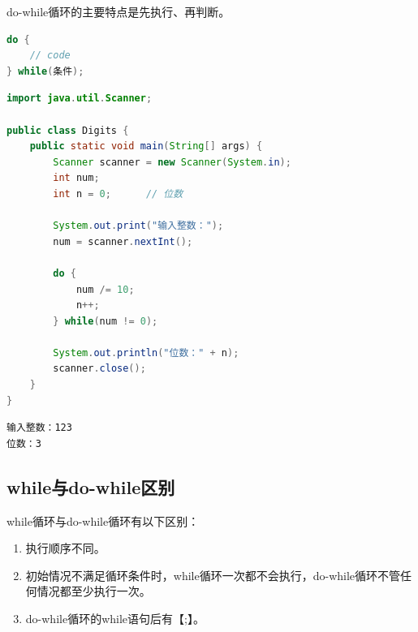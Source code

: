 do-while循环的主要特点是先执行、再判断。

\vspace{-0.5cm}

\begin{lstlisting}[language=Java]
do {
    // code
} while(条件);
\end{lstlisting}

\vspace{0.5cm}


\begin{lstlisting}[language=Java]
import java.util.Scanner;

public class Digits {
    public static void main(String[] args) {
        Scanner scanner = new Scanner(System.in);
        int num;
        int n = 0;      // 位数
        
        System.out.print("输入整数：");
        num = scanner.nextInt();
        
        do {
            num /= 10;
            n++;
        } while(num != 0);
        
        System.out.println("位数：" + n);
        scanner.close();
    }
}
\end{lstlisting}

\begin{tcolorbox}
\begin{verbatim}
输入整数：123
位数：3
\end{verbatim}
\end{tcolorbox}

\vspace{0.5cm}

\subsection{while与do-while区别}

while循环与do-while循环有以下区别：

\begin{enumerate}
	\item 执行顺序不同。

	\item 初始情况不满足循环条件时，while循环一次都不会执行，do-while循环不管任何情况都至少执行一次。

	\item do-while循环的while语句后有【;】。
\end{enumerate}


